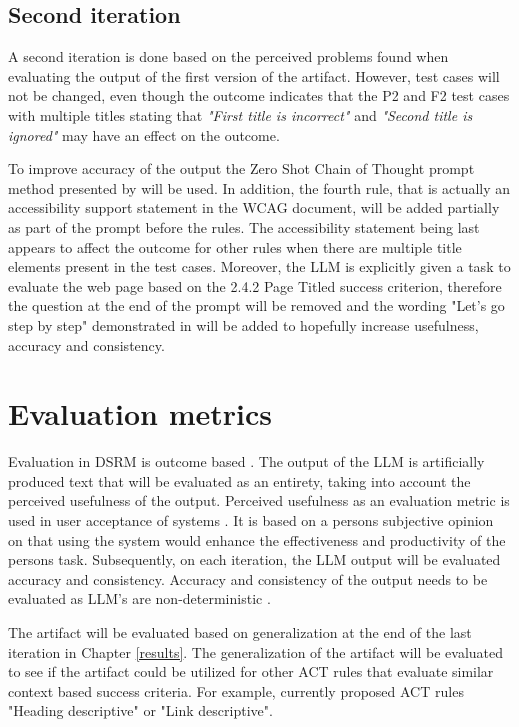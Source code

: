 \subsection{Second iteration}

A second iteration is done based on the perceived problems found when evaluating the output of the first version of the artifact. However, test cases will not be changed, even though the outcome indicates that the P2 and F2 test cases with multiple titles stating that \textit{"First title is incorrect"} and \textit{"Second title is ignored"} may have an effect on the outcome.

To improve accuracy of the output the Zero Shot Chain of Thought prompt method presented by \textcite{kojima2023large} will be used. In addition, the fourth rule, that is actually an accessibility support statement in the WCAG \textcite{act_rule_g88} document, will be added partially as part of the prompt before the rules. The accessibility statement being last appears to affect the outcome for other rules when there are multiple title elements present in the test cases. Moreover, the LLM is explicitly given a task to evaluate the web page based on the 2.4.2 Page Titled success criterion, therefore the question at the end of the prompt will be removed and the wording "Let's go step by step" demonstrated in \textcite{kojima2023large} will be added to hopefully increase usefulness, accuracy and consistency.

\section{Evaluation metrics}

Evaluation in DSRM is outcome based \citep{design_science_eval}. The output of the LLM is artificially produced text that will be evaluated as an entirety, taking into account the perceived usefulness of the output. Perceived usefulness as an evaluation metric is used in user acceptance of systems \citep{perceived_usefulness}. It is based on a persons subjective opinion on that using the system would enhance the effectiveness and productivity of the persons task. Subsequently, on each iteration, the LLM output will be evaluated accuracy and consistency. Accuracy and consistency of the output needs to be evaluated as LLM's are non-deterministic \citep{ouyang2023llm, power_determinism}.

The artifact will be evaluated based on generalization at the end of the last iteration in Chapter \ref{results}. The generalization of the artifact will be evaluated to see if the artifact could be utilized for other ACT rules that evaluate similar context based success criteria. For example, currently proposed ACT rules "Heading descriptive" or "Link descriptive".

